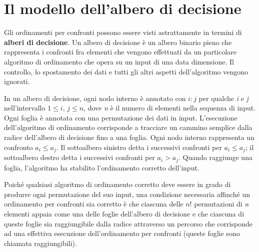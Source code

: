 \documentclass[10pt, a4paper]{report}
\begin{document}
\section{Il modello dell'albero di decisione}
Gli ordinamenti per confronti possono essere visti astrattamente in termini di \textbf{alberi di decisione}. Un albero di decisione è un albero binario pieno che rappresenta i confronti fra elementi che vengono effettuati da un particolare algoritmo di ordinamento che opera su un input di una data dimensione. Il controllo, lo spostamento dei dati e tutti gli altri aspetti dell'algoritmo vengono ignorati.

In un albero di decisione, ogni nodo interno è annotato con $i:j$ per qualche \textit{i} e \textit{j} nell'intervallo $1 \leq i$, $j \leq n$, dove \textit{n} è il numero di elementi nella sequenza di input. Ogni foglia è annotata con una permutazione dei dati in input. L'esecuzione dell'algoritmo di ordinamento corrisponde a tracciare un cammino semplice dalla radice dell'albero di decisione fino a una foglia. Ogni nodo interno rappresenta un confronto $a_i \leq a_j$. Il sottoalbero sinistro detta i successivi confronti per $a_i \leq a_j$; il sottoalbero destro detta i successivi confronti per $a_i > a_j$. Quando raggiunge una foglia, l'algoritmo ha stabilito l'ordinamento corretto dell'input. 

Poiché qualsiasi algoritmo di ordinamento corretto deve essere in grado di produrre ogni permutazione del suo input, una condizione necessaria affinché un ordinamento per confronti sia corretto è che ciascuna delle $n!$ permutazioni di \textit{n} elementi appaia come una delle foglie dell'albero di decisione e che ciascuna di queste foglie sia raggiungibile dalla radice attraverso un percorso che corrisponde ad una effettiva esecuzione dell'ordinamento per confronti (queste foglie sono chiamata raggiungibili).
\end{document}
